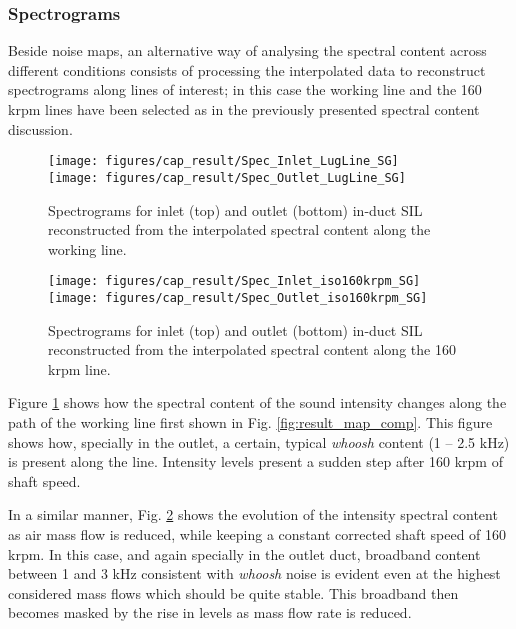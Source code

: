 \subsubsection{Spectrograms}

Beside noise maps, an alternative way of analysing the spectral content across different conditions consists of processing the interpolated data to reconstruct spectrograms along lines of interest; in this case the working line and the 160 krpm lines have been selected as in the previously presented spectral content discussion.

\begin{figure}[tbh!]
\centering
\texttt{[image: figures/cap\_result/Spec\_Inlet\_LugLine\_SG]}\\[5mm]
\texttt{[image: figures/cap\_result/Spec\_Outlet\_LugLine\_SG]}
\caption[Spectrograms along the working line]{Spectrograms for inlet (top) and outlet (bottom) in-duct SIL reconstructed from the interpolated spectral content along the working line.}
\label{fig:result_LugLine_SG}
\end{figure}

\begin{figure}[tbh!]
\centering
\texttt{[image: figures/cap\_result/Spec\_Inlet\_iso160krpm\_SG]}\vspace{5mm}
\texttt{[image: figures/cap\_result/Spec\_Outlet\_iso160krpm\_SG]}
\caption[Spectrograms along the 160 krpm line]{Spectrograms for inlet (top) and outlet (bottom) in-duct SIL reconstructed from the interpolated spectral content along the 160 krpm line.}
\label{fig:result_iso160krpm_SG}
\end{figure}

Figure \ref{fig:result_LugLine_SG} shows how the spectral content of the sound intensity changes along the path of the working line first shown in Fig. \ref{fig:result_map_comp}. This figure shows how, specially in the outlet, a certain, typical \emph{whoosh} content (1 -- 2.5 kHz) is present along the line. Intensity levels present a sudden step after 160 krpm of shaft speed.

In a similar manner, Fig. \ref{fig:result_iso160krpm_SG} shows the evolution of the intensity spectral content as air mass flow is reduced, while keeping a constant corrected shaft speed of 160 krpm. In this case, and again specially in the outlet duct, broadband content between 1 and 3 kHz consistent with \emph{whoosh} noise is evident even at the highest considered mass flows which should be quite stable. This broadband then becomes masked by the rise in levels as mass flow rate is reduced.

